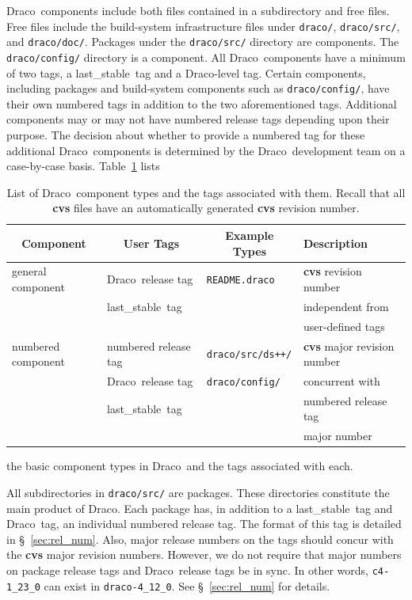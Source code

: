 \documentclass[11pt]{nmemo}
\newcommand{\draco}{{\normalfont\normalsize\sffamily Draco}}
\newcommand{\stable}{{\normalfont\normalsize\ttfamily last\_stable}}
\begin{document}
\draco\ components include both files contained in a subdirectory and
free files.  Free files include the build-system infrastructure files
under \texttt{draco/}, \texttt{draco/src/}, and \texttt{draco/doc/}.
Packages under the \texttt{draco/src/} directory are components.  The
\texttt{draco/config/} directory is a component.  All \draco\ 
components have a minimum of two tags, a \stable\ tag and a
\draco-level tag.  Certain components, including packages and
build-system components such as \texttt{draco/config/}, have their own
numbered tags in addition to the two aforementioned tags.  Additional
components may or may not have numbered release tags depending upon
their purpose.  The decision about whether to provide a numbered tag
for these additional \draco\ components is determined by the \draco\ 
development team on a case-by-case basis.  Table~\ref{tab:tag} lists
\begin{table}
  \caption{List of \draco\ component types and the tags associated
    with them.  Recall that all {\bf cvs} files have an automatically
    generated {\bf cvs} revision number.}
  \label{tab:tag}
  \begin{center}
    \begin{tabular}{llll}\hline\hline
      \multicolumn{1}{c}{Component} & \multicolumn{1}{c}{User Tags} &
      \multicolumn{1}{c}{Example Types} & Description \\ \hline
      general component & \draco\ release tag &
      \texttt{README.draco} & {\bf cvs} revision number \\
      & \stable\ tag & & independent from  \\
      & & & user-defined tags\\\hline
      numbered component & numbered release tag  &
      \texttt{draco/src/ds++/} & {\bf cvs} major revision number \\
      & \draco\ release tag & \texttt{draco/config/} & concurrent with \\
      & \stable\ tag & & numbered release tag \\
      & & & major number\\\hline\hline
    \end{tabular}
  \end{center}
\end{table}
the basic component types in \draco\ and the tags associated with
each. 

All subdirectories in \texttt{draco/src/} are packages.  These
directories constitute the main product of \draco.  Each package has,
in addition to a \stable\ tag and \draco\ tag, an individual numbered
release tag.  The format of this tag is detailed in
\S~\ref{sec:rel_num}.  Also, major release numbers on the tags should
concur with the {\bf cvs} major revision numbers.  However, we do not
require that major numbers on package release tags and \draco\ release
tags be in sync.  In other words, \texttt{c4-1\_23\_0} can exist in
\texttt{draco-4\_12\_0}.  See \S~\ref{sec:rel_num} for details.
\end{document}

